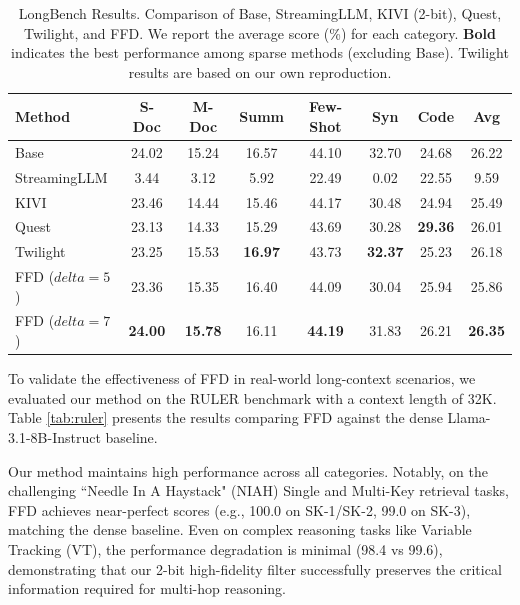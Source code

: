\documentclass[]{mosi}
\def\delta{delta}%
\theoremstyle{plain}
\theoremstyle{definition}
\theoremstyle{remark}
\begin{document}
\begin{table}[t]
\caption{LongBench Results. Comparison of Base, StreamingLLM, KIVI (2-bit), Quest, Twilight, and FFD. We report the average score (\%) for each category. \textbf{Bold} indicates the best performance among sparse methods (excluding Base). Twilight results are based on our own reproduction.}
\label{tab:longbench}
\begin{center}
\begin{small}
\begin{sc}
\begin{tabular}{lccccccc}
\toprule
Method & S-Doc & M-Doc & Summ & Few-Shot & Syn & Code & Avg \\
\midrule
Base & 24.02 & 15.24 & 16.57 & 44.10 & 32.70 & 24.68 & 26.22 \\
StreamingLLM & 3.44 & 3.12 & 5.92 & 22.49 & 0.02 & 22.55 & 9.59 \\
KIVI & 23.46 & 14.44 & 15.46 & 44.17 & 30.48 & 24.94 & 25.49 \\
Quest & 23.13 & 14.33 & 15.29 & 43.69 & 30.28 & \textbf{29.36} & 26.01 \\
Twilight & 23.25 & 15.53 & \textbf{16.97} & 43.73 & \textbf{32.37} & 25.23 & 26.18 \\
FFD ($\delta=5$) & 23.36 & 15.35 & 16.40 & 44.09 & 30.04 & 25.94 & 25.86 \\
FFD ($\delta=7$) & \textbf{24.00} & \textbf{15.78} & 16.11 & \textbf{44.19} & 31.83 & 26.21 & \textbf{26.35} \\
\bottomrule
\end{tabular}
\end{sc}
\end{small}
\end{center}
\vskip -0.1in
\end{table}


To validate the effectiveness of FFD in real-world long-context scenarios, we evaluated our method on the RULER benchmark \citep{hsieh2024ruler} with a context length of 32K. Table \ref{tab:ruler} presents the results comparing FFD against the dense Llama-3.1-8B-Instruct baseline.

Our method maintains high performance across all categories. Notably, on the challenging ``Needle In A Haystack" (NIAH) Single and Multi-Key retrieval tasks, FFD achieves near-perfect scores (e.g., 100.0 on SK-1/SK-2, 99.0 on SK-3), matching the dense baseline. Even on complex reasoning tasks like Variable Tracking (VT), the performance degradation is minimal (98.4 vs 99.6), demonstrating that our 2-bit high-fidelity filter successfully preserves the critical information required for multi-hop reasoning.
\end{document}
